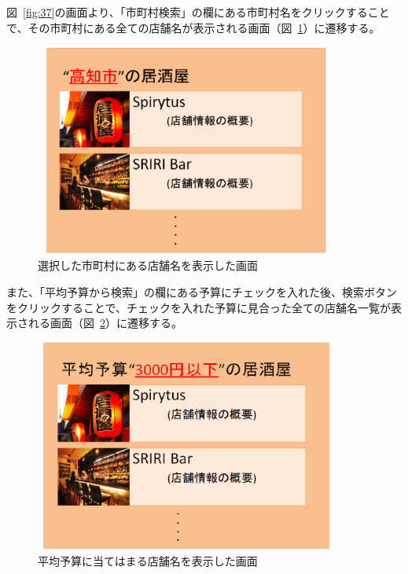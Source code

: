 \documentclass[a4j,titlepage]{jarticle}
\begin{document}
\clearpage
図~\ref{fig:37}の画面より、「市町村検索」の欄にある市町村名をクリックすることで、その市町村にある全ての店舗名が表示される画面（図~\ref{fig:38}）に遷移する。



\begin {figure}[!htbp]
    \begin{center}
    \includegraphics [height=7cm, width=10cm]{38.eps}
    \caption {選択した市町村にある店舗名を表示した画面}
    \label {fig:38}
    \end{center}
\end {figure}



また、「平均予算から検索」の欄にある予算にチェックを入れた後、検索ボタンをクリックすることで、チェックを入れた予算に見合った全ての店舗名一覧が表示される画面（図~\ref{fig:39}）に遷移する。



\begin {figure}[!htbp]
    \begin{center}
    \includegraphics [height=7cm, width=10cm]{39.eps}
    \caption {平均予算に当てはまる店舗名を表示した画面}
    \label {fig:39}
    \end{center}
\end {figure}
\end{document}
